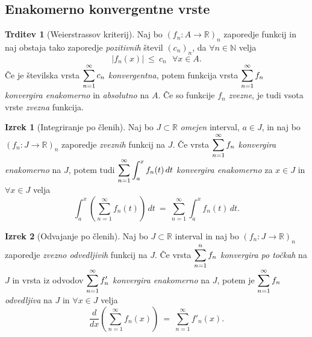\documentclass[11pt]{article}
\newcommand{\R}{\mathbb{R}}
\newcommand{\N}{\mathbb{N}}
\theoremstyle{definition}
\theoremstyle{definition}
\newtheorem{trditev}{Trditev}[section]
\theoremstyle{definition}
\newtheorem{izrek}{Izrek}[section]
\theoremstyle{theorem}
\begin{document}

\subsection{Enakomerno konvergentne vrste}
\vspace{0.5cm}

\begin{trditev}[Weierstrassov kriterij]

Naj bo $(f_n: A \rightarrow \R)_n$ zaporedje funkcij in naj obstaja tako zaporedje \textit{pozitivnih} števil $(c_n)_n$, da $\forall n \in \N$ velja
$$|f_n(x)| ~\leq~ c_n ~~~\forall x \in A.$$
Če je številska vrsta $\mathlarger{\sum_{n=1}^\infty c_n}$ \textit{konvergentna}, potem funkcija vrsta $\mathlarger{\sum_{n=1}^\infty f_n}$ \textit{\\\hbox{konvergira} enakomerno} in \textit{absolutno} na $A$. Če so funkcije $f_n$ \textit{zvezne}, je tudi vsota vrste \textit{zvezna} funkcija.

\end{trditev}
\vspace{0.5cm}

\begin{izrek}[Integriranje po členih]

Naj bo $J \subset \R$ \textit{omejen} interval, \hbox{$a \in J$}, in naj bo $(f_n: J \rightarrow \R)_n$ zaporedje \textit{zveznih} funkcij na $J$. Če vrsta $\mathlarger{\sum_{n=1}^\infty f_n}$ \textit{\hbox{konvergira} enakomerno} na $J$, potem tudi $\mathlarger{\sum_{n=1}^\infty \int_a^x f_n(t)\,dt}$ \textit{\hbox{konvergira} \hbox{enakomerno}} za $x \in J$ in $\forall x \in J$ velja
$$\int_a^x \left( \sum_{n=1}^\infty f_n(t) \right)\,dt ~=~ \sum_{n=1}^\infty \int_a^x f_n(t)\,dt.$$

\end{izrek}
\vspace{0.5cm}

\begin{izrek}[Odvajanje po členih]

Naj bo $J \subset \R$ interval in naj bo \hbox{$(f_n: J \rightarrow \R)_n$} zaporedje \textit{zvezno odvedljivih} funkcij na $J$. Če vrsta $\mathlarger{\sum_{n=1}^n f_n}$ \textit{konvergira po točkah} na $J$ in vrsta iz odvodov $\mathlarger{\sum_{n=1}^\infty f'_n}$ \textit{konvergira enakomerno} na $J$, potem je $\mathlarger{\sum_{n=1}^\infty f_n}$ \textit{odvedljiva} na $J$ in $\forall x \in J$ velja
$$\frac{d}{dx} \left( \sum_{n=1}^\infty f_n(x) \right) ~=~ \sum_{n=1}^\infty f'_n(x).$$

\end{izrek}
\vspace{0.5cm}
\end{document}
